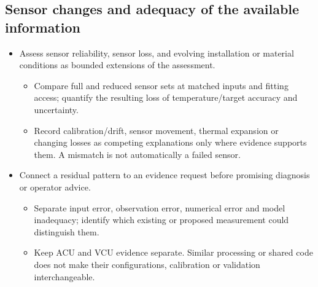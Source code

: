 \subsection{Sensor changes and adequacy of the available information}\label{subsec:sensor-changes-and-adequacy-of-the-available-information}

\begin{itemize}[leftmargin=*]
\item Assess sensor reliability, sensor loss, and evolving installation or material conditions as bounded extensions of the assessment.
\begin{itemize}
\item Compare full and reduced sensor sets at matched inputs and fitting access; quantify the resulting loss of temperature/\allowbreak{}target accuracy and uncertainty.
\item Record calibration/\allowbreak{}drift, sensor movement, thermal expansion or changing losses as competing explanations only where evidence supports them. A mismatch is not automatically a failed sensor.
\end{itemize}
\item Connect a residual pattern to an evidence request before promising diagnosis or operator advice.
\begin{itemize}
\item Separate input error, observation error, numerical error and model inadequacy; identify which existing or proposed measurement could distinguish them.
\item Keep ACU and VCU evidence separate. Similar processing or shared code does not make their configurations, calibration or validation interchangeable.
\end{itemize}
\end{itemize}
